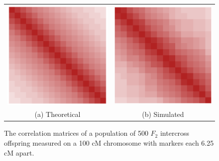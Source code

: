 \documentclass[12pt]{article}
\begin{document}
\begin{figure}[h!]
  \begin{center}
    \begin{tabular}{cc}
      \includegraphics[scale=0.4]{../img/chevSimTheory.png} &
      \includegraphics[scale=0.4]{../img/chevSim.png} \\
      {\footnotesize (a) Theoretical} &
      {\footnotesize (b) Simulated} \\
    \end{tabular}
  \end{center}
  \caption{The correlation matrices of a population of 500 $F_2$ intercross offspring measured on a 100 cM chromosome with markers each 6.25 cM apart.}
  \label{fig:chevSims}
\end{figure}
\end{document}
